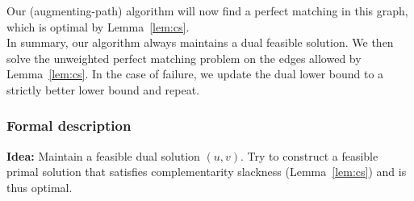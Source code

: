 \begin{center}
\end{center}

Our (augmenting-path) algorithm will now find a perfect matching in this graph, which is optimal
by Lemma~\ref{lem:cs}.\\

In summary, our algorithm always maintains a dual feasible solution. We then solve the unweighted
perfect matching problem on the edges allowed by Lemma~\ref{lem:cs}. In the case of failure,
we update the dual lower bound to a strictly better lower bound and repeat.

\subsubsection*{Formal description}

\textbf{Idea:} Maintain a feasible dual solution $(u,v)$. Try to construct a feasible primal
solution that satisfies complementarity slackness (Lemma~\ref{lem:cs}) and is thus optimal.

